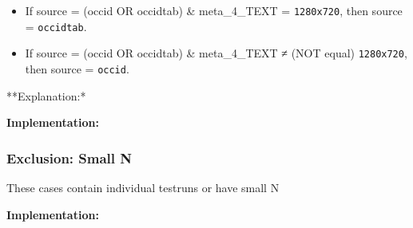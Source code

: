 \documentclass[]{article}
\newenvironment{Shaded}{\begin{snugshade}}{\end{snugshade}}
\newcommand{\KeywordTok}[1]{\textcolor[rgb]{0.94,0.87,0.69}{{#1}}}
\newcommand{\StringTok}[1]{\textcolor[rgb]{0.80,0.58,0.58}{{#1}}}
\newcommand{\NormalTok}[1]{\textcolor[rgb]{0.80,0.80,0.80}{{#1}}}
\begin{document}
\begin{itemize}
\itemsep1pt\parskip0pt
\item
  If source = (occid OR occidtab) \& meta\_4\_TEXT = \texttt{1280x720},
  then source = \texttt{occidtab}.
\item
  If source = (occid OR occidtab) \& meta\_4\_TEXT ≠ (NOT equal)
  \texttt{1280x720}, then source = \texttt{occid}.
\end{itemize}

**Explanation:*

\textbf{Implementation:}

\begin{Shaded}
\end{Shaded}

\subsubsection{\textbf{Exclusion:} Small N}\label{exclusion-small-n}

These cases contain individual testruns or have small N

\textbf{Implementation:}
\end{document}
